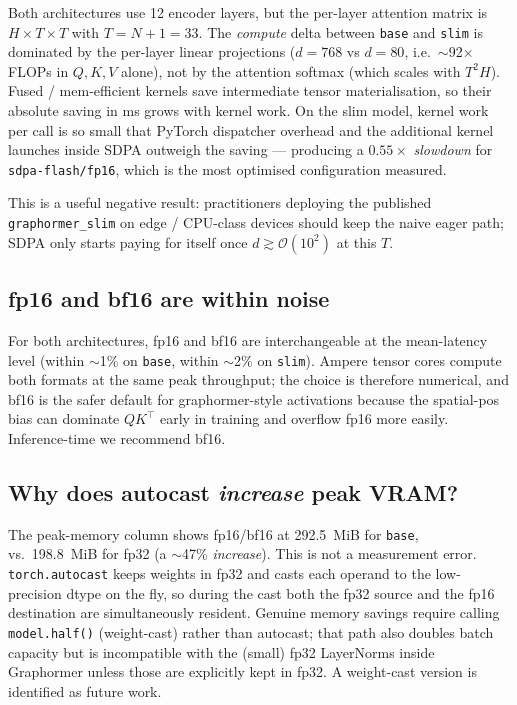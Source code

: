 \documentclass[11pt]{article}
\begin{document}
Both architectures use 12 encoder layers, but the per-layer attention
matrix is $H \times T \times T$ with $T = N{+}1 = 33$. The
\emph{compute} delta between \texttt{base} and \texttt{slim} is
dominated by the per-layer linear projections ($d{=}768$ vs $d{=}80$,
i.e.\ $\sim$92$\times$ FLOPs in $Q,K,V$ alone), not by the attention
softmax (which scales with $T^2 H$). Fused / mem-efficient kernels save
intermediate tensor materialisation, so their absolute saving in ms
grows with kernel work. On the slim model, kernel work per call is so
small that PyTorch dispatcher overhead and the additional kernel
launches inside SDPA outweigh the saving --- producing a $0.55\times$
\emph{slowdown} for \texttt{sdpa-flash/fp16}, which is the most
optimised configuration measured.

This is a useful negative result: practitioners deploying the published
\texttt{graphormer\_slim} on edge / CPU-class devices should keep the
naive eager path; SDPA only starts paying for itself once $d \gtrsim
\mathcal{O}(10^2)$ at this $T$.

\subsection{fp16 and bf16 are within noise}

For both architectures, fp16 and bf16 are interchangeable at the
mean-latency level (within $\sim$1\% on \texttt{base}, within $\sim$2\%
on \texttt{slim}). Ampere tensor cores compute both formats at the same
peak throughput; the choice is therefore numerical, and bf16 is the
safer default for graphormer-style activations because the spatial-pos
bias can dominate $QK^{\top}$ early in training and overflow fp16 more
easily. Inference-time we recommend bf16.

\subsection{Why does autocast \emph{increase} peak VRAM?}

The peak-memory column shows fp16/bf16 at 292.5~MiB for
\texttt{base}, vs.\ 198.8~MiB for fp32 (a $\sim$47\% \emph{increase}).
This is not a measurement error. \texttt{torch.autocast} keeps weights
in fp32 and casts each operand to the low-precision dtype on the fly,
so during the cast both the fp32 source and the fp16 destination are
simultaneously resident. Genuine memory savings require calling
\texttt{model.half()} (weight-cast) rather than autocast; that path
also doubles batch capacity but is incompatible with the (small) fp32
LayerNorms inside Graphormer unless those are explicitly kept in fp32.
A weight-cast version is identified as future work.
\end{document}
